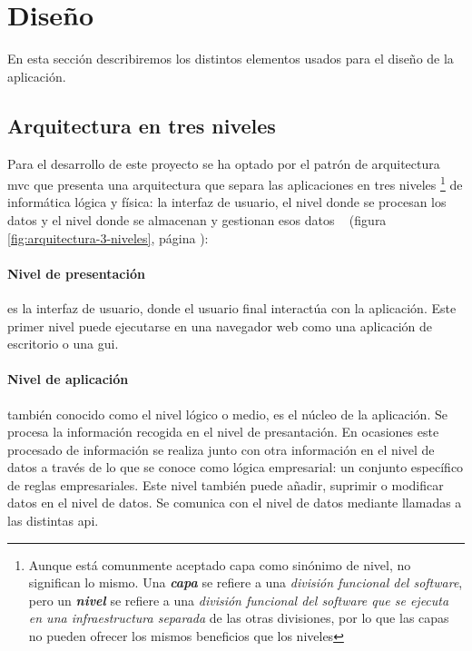 \section{Diseño}
\label{sec:disenho}

En esta sección describiremos los distintos elementos usados para el diseño de la aplicación.


\subsection{Arquitectura en tres niveles}
\label{sub:arquitectura3niveles}

Para el desarrollo de este proyecto se ha optado por el patrón de arquitectura \acrlong{mvc} que presenta una arquitectura que separa las aplicaciones en tres niveles \footnote{Aunque está comunmente aceptado capa como sinónimo de nivel, no significan lo mismo. Una \textit{\textbf{capa}} se refiere a una \textit{división funcional del software}, pero un \textit{\textbf{nivel}} se refiere a una \textit{división funcional del software que se ejecuta en una infraestructura separada}  de las otras divisiones, por lo que las capas no pueden ofrecer los mismos beneficios que los niveles} de informática lógica y física: la interfaz de usuario, el nivel donde se procesan los datos y el nivel donde se almacenan y gestionan esos datos ~\cite{ibmMVC} (figura \ref{fig:arquitectura-3-niveles}, página \pageref{fig:arquitectura-3-niveles}):

\paragraph{Nivel de presentación} es la interfaz de usuario, donde el usuario final interactúa con la aplicación. Este primer nivel puede ejecutarse en una navegador web como una aplicación de escritorio o una \acrshort{gui}.

\paragraph{Nivel de aplicación} también conocido como el nivel lógico o medio, es el núcleo de la aplicación. Se procesa la información recogida en el nivel de presantación. En ocasiones este procesado de información se realiza junto con otra información en el nivel de datos a través de lo que se conoce como  lógica empresarial: un conjunto específico de reglas empresariales. Este nivel también puede añadir, suprimir o modificar datos en el nivel de datos. Se comunica con el nivel de datos mediante llamadas a las distintas \acrshort{api}. 

